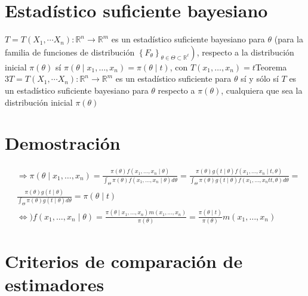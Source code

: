 \section*{Estadístico suficiente bayesiano}
$T=T\left(X_{1}, \cdots X_{n}\right): \mathbb{R}^{n} \longrightarrow \mathbb{R}^{m}$ es un estadístico suficiente bayesiano para $\theta$ (para la familia de funciones de distribución $\left.\left\{F_{\theta}\right\}_{\theta \in \Theta \subset \mathbb{R}^{\ell}}\right)$, respecto a la distribución inicial $\pi(\theta)$ sí $\pi\left(\theta \mid x_{1}, \ldots, x_{n}\right)=\pi(\theta \mid t)$, con $T\left(x_{1}, \ldots, x_{n}\right)=t$Teorema $3 T=T\left(X_{1}, \cdots X_{n}\right): \mathbb{R}^{n} \longrightarrow \mathbb{R}^{m}$ es un estadístico suficiente para $\theta$ sí y sólo sí $T$ es un estadístico suficiente bayesiano para $\theta$ respecto a $\pi(\theta)$, cualquiera que sea la distribución inicial $\pi(\theta)$

\section*{Demostración}
$$
	\begin{aligned}
		 & \Rightarrow \pi\left(\theta \mid x_{1}, \ldots, x_{n}\right)=\frac{\pi(\theta) f\left(x_{1}, \ldots, x_{n} \mid \theta\right)}{\int_{\Theta} \pi(\theta) f\left(x_{1}, \ldots, x_{n} \mid \theta\right) d \theta}=\frac{\pi(\theta) g(t \mid \theta) f\left(x_{1}, \ldots, x_{n} \mid t, \theta\right)}{\int_{\Theta} \pi(\theta) g(t \mid \theta) f\left(x_{1}, \ldots, x_{n} t t, \theta\right) d \theta}= \\
		 & \frac{\pi(\theta) g(t \mid \theta)}{\int_{\Theta} \pi(\theta) g(t \mid \theta) d \theta}=\pi(\theta \mid t)                                                                                                                                                                                                                                                                                                  \\
		 & \Leftrightarrow) f\left(x_{1}, \ldots, x_{n} \mid \theta\right)=\frac{\pi\left(\theta \mid x_{1}, \ldots, x_{n}\right) m\left(x_{1}, \ldots, x_{n}\right)}{\pi(\theta)}=\frac{\pi(\theta \mid t)}{\pi(\theta)} m\left(x_{1}, \ldots, x_{n}\right)
	\end{aligned}
$$

\section*{Criterios de comparación de estimadores}
